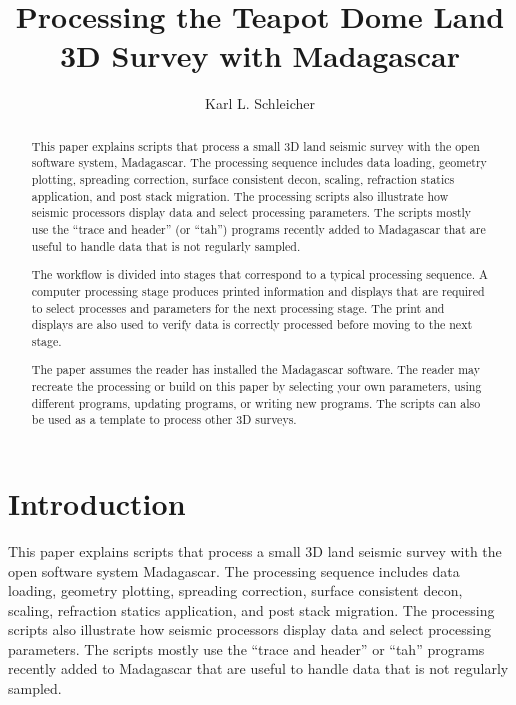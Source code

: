 
\title{Processing the Teapot Dome Land 3D Survey with Madagascar}               %
\author{Karl L. Schleicher}

\address{
k\_schleicher@hotmail.com \\
Texas Consortium for Computation Seismology \\
John A. and Katherine G. Jackson School of Geosciences \\
The University of Texas at Austin \\
University Station, Box X \\
Austin, TX 78713-8924}

\maketitle

\begin{abstract}
This paper explains scripts that process a small 3D land seismic survey with 
the open software system, Madagascar.  The processing sequence includes data 
loading, geometry plotting, spreading correction, surface consistent decon, 
scaling, refraction statics application, and post stack migration.  The
processing scripts also illustrate how seismic processors display data and 
select processing parameters.  The scripts mostly use the “trace and header” 
(or “tah”) programs recently added to Madagascar that are useful to handle data
that is not regularly sampled. 

The workflow is divided into stages that correspond to a typical processing 
sequence.  A computer processing stage produces printed information and
displays that are required to select processes and parameters for the next 
processing stage. The print and displays are also used to verify data is 
correctly processed before moving to the next stage.

The paper assumes the reader has installed the Madagascar software.  The 
reader may recreate the processing or build on this paper by selecting your 
own parameters, using different programs, updating programs, or writing new 
programs.  The scripts can also be used as a template to process other 3D 
surveys.
\end{abstract}

\section{Introduction}
This paper explains scripts that process a small 3D land seismic survey with the open software system Madagascar.  The processing sequence includes data loading, geometry plotting, spreading correction, surface consistent decon, scaling, refraction statics application, and post stack migration.  The processing scripts also illustrate how seismic processors display data and select processing parameters.  The scripts mostly use the “trace and header” or “tah” programs recently added to Madagascar that are useful to handle data that is not regularly sampled. 

